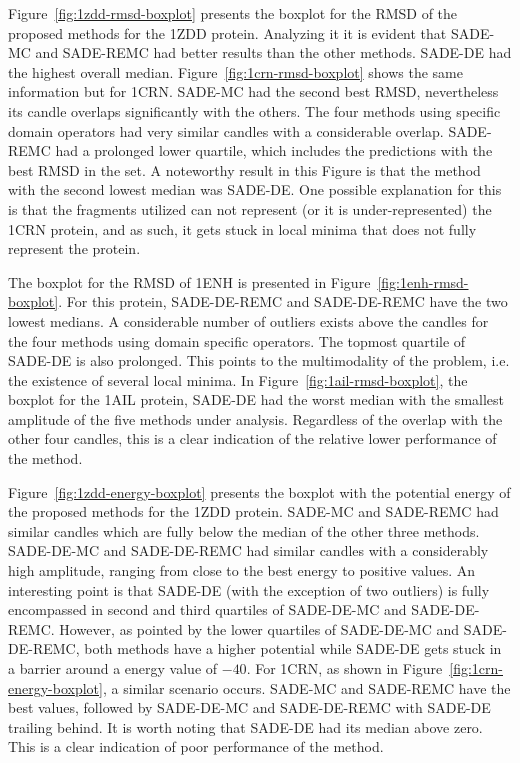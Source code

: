 

Figure~\ref{fig:1zdd-rmsd-boxplot} presents the boxplot for the \ac{RMSD}
of the proposed methods for the 1ZDD protein. Analyzing it it is evident that SADE-MC and
SADE-REMC had better results than the other methods. SADE-DE had the highest overall median.
Figure~\ref{fig:1crn-rmsd-boxplot} shows the same information but for 1CRN. SADE-MC had
the second best \ac{RMSD}, nevertheless its candle overlaps significantly with the others.
The four methods using specific domain operators had very similar candles with a
considerable overlap. SADE-REMC had a prolonged lower quartile, which includes
the predictions with the best \ac{RMSD} in the set.
A noteworthy result in this Figure is that the method with the second lowest median was SADE-DE.
One possible explanation for this is that the fragments utilized can not represent
(or it is under-represented) the 1CRN protein, and as such, it gets stuck in local
minima that does not fully represent the protein.

The boxplot for the \ac{RMSD} of 1ENH is presented in Figure~\ref{fig:1enh-rmsd-boxplot}.
For this protein, SADE-DE-REMC and SADE-DE-REMC have the two lowest medians. A considerable number
of outliers exists above the candles for the four methods using domain specific operators.
The topmost quartile of SADE-DE is also prolonged. This points to the multimodality
of the problem, i.e. the existence of several local minima. In Figure~\ref{fig:1ail-rmsd-boxplot}, the boxplot for the 1AIL protein, SADE-DE had the worst median with the smallest amplitude of the five methods under analysis.
Regardless of the overlap with the other four candles, this is a clear indication
of the relative lower performance of the method.

Figure~\ref{fig:1zdd-energy-boxplot} presents the boxplot with the potential energy
of the proposed methods for the 1ZDD protein. SADE-MC and SADE-REMC had similar candles
which are fully below the median of the other three methods. SADE-DE-MC and SADE-DE-REMC had
similar candles with a considerably high amplitude, ranging from close to the best energy to
positive values. An interesting point is that SADE-DE (with the exception of two outliers)
is fully encompassed in second and third quartiles of SADE-DE-MC and SADE-DE-REMC.
However, as pointed by the lower quartiles of SADE-DE-MC and SADE-DE-REMC, both methods
have a higher potential while SADE-DE gets stuck in a barrier around a energy value of $-40$.
For 1CRN, as shown in Figure~\ref{fig:1crn-energy-boxplot}, a similar scenario occurs.
SADE-MC and SADE-REMC have the best values, followed by SADE-DE-MC and SADE-DE-REMC with
SADE-DE trailing behind. It is worth noting that SADE-DE had its median above zero. This
is a clear indication of poor performance of the method.

